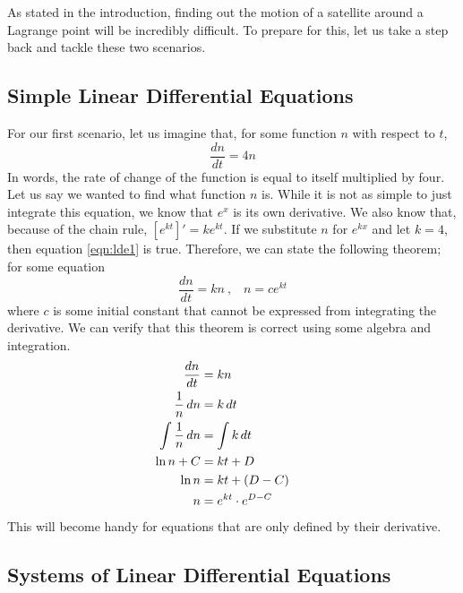 As stated in the introduction, finding out the motion of a satellite around a Lagrange point will be incredibly difficult.
To prepare for this, let us take a step back and tackle these two scenarios.

\subsection{Simple Linear Differential Equations} \label{sec:ode}

For our first scenario, let us imagine that, for some function $n$ with respect to $t$,
\begin{equation}\label{eqn:lde1}
	\frac{dn}{dt} = 4n
\end{equation}
In words, the rate of change of the function is equal to itself multiplied by four. Let us say we wanted to find what function $n$ is.
While it is not as simple to just integrate this equation, we know that $e^x$ is its own derivative.
We also know that, because of the chain rule, $[e^{kt}]' = ke^{kt}$.
If we substitute $n$ for $e^{kx}$ and let $k = 4$, then equation \eqref{eqn:lde1} is true.
Therefore, we can state the following theorem; for some equation
\begin{equation}\label{eqn:theory1}
	\frac{dn}{dt} = kn\ \text{,} \quad n = ce^{kt}
\end{equation}
where $c$ is some initial constant that cannot be expressed from integrating the derivative.
We can verify that this theorem is correct using some algebra and integration.
\begin{align*}
	\frac{dn}{dt} &= kn \\
	\frac{1}{n}\, dn &= k\, dt \\
	\int \frac{1}{n}\, dn &= \int k\, dt \\
	\ln n + C &= kt + D \\
	\ln n &= kt + (D - C) \\
	n &= e^{kt} \cdot e^{D - C} \hspace*{3em}
\end{align*}
This will become handy for equations that are only defined by their derivative.

\subsection{Systems of Linear Differential Equations} \label{sec:ode-sys}

